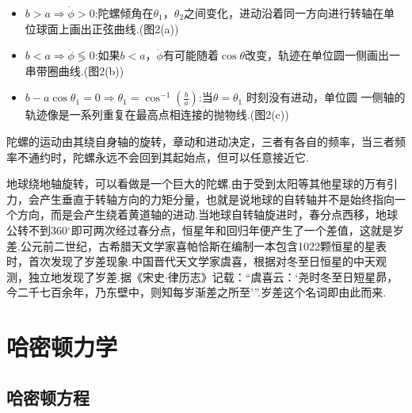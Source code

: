 \documentclass[UTF8,10.5pt,a4paper]{ctexart}
\numberwithin{equation}{section}
\theoremstyle{definition}
\theoremstyle{definition}
\begin{document}
\begin{itemize}
 \item [(1)]$b > a \Rightarrow \dot{\phi} > 0$:陀螺倾角在$\theta_{1}$，$\theta_{2}$之间变化，进动沿着同一方向进行转轴在单位球面上画出正弦曲线.(图2(a))
 \item [(2)]$b < a \Rightarrow \dot{\phi} \lessgtr 0 $:如果$b < a $，$\dot{\phi}$有可能随着$\cos \theta$改变，轨迹在单位圆一侧画出一串带圈曲线.(图2(b))
 \item [(3)]$b - a\cos \theta_{1} = 0 \Rightarrow\theta_{1} = \cos^{-1}\left( \frac{b}{a} \right)$:当$\theta = \theta_{1}$ 时刻没有进动，单位圆
 一侧轴的轨迹像是一系列重复在最高点相连接的抛物线.(图2(c))
 \end{itemize}
 \par 陀螺的运动由其绕自身轴的旋转，章动和进动决定，三者有各自的频率，当三者频率不通约时，陀螺永远不会回到其起始点，但可以任意接近它.\cite{AI3}
\par 地球绕地轴旋转，可以看做是一个巨大的陀螺.由于受到太阳等其他星球的万有引力，会产生垂直于转轴方向的力矩分量，也就是说地球的自转轴并不是始终指向一个方向，而是会产生绕着黄道轴的进动.当地球自转轴旋进时，春分点西移，地球公转不到360$^{\circ}$即可两次经过春分点，恒星年和回归年便产生了一个差值，这就是岁差.公元前二世纪，古希腊天文学家喜帕恰斯在编制一本包含1022颗恒星的星表时，首次发现了岁差现象.中国晋代天文学家虞喜，根据对冬至日恒星的中天观测，独立地发现了岁差.据《宋史$\cdot$律历志》记载：“虞喜云：‘尧时冬至日短星昴，今二千七百余年，乃东壁中，则知每岁渐差之所至'”.岁差这个名词即由此而来.
\newpage
\section{哈密顿力学}
\subsection{哈密顿方程}
\end{document}

